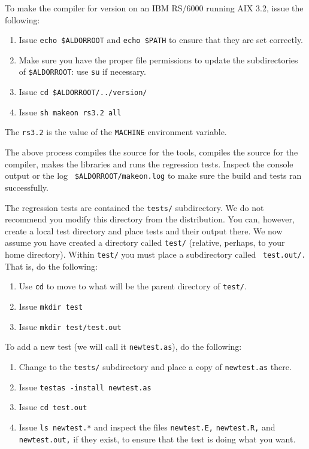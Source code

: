 To make the compiler for version {\tt \asharpver{}} on an IBM RS/6000
running AIX 3.2, issue the following:
\begin{enumerate}
\item Issue {\tt echo \$ALDORROOT} and {\tt echo \$PATH} to ensure
that they are set correctly.
\item Make sure you have the proper file permissions to update
the subdirectories of {\tt \$ALDORROOT}: use {\tt su} if
necessary.
\item Issue {\tt cd \$ALDORROOT/../version/\asharpver{}}
\item Issue {\tt sh makeon rs3.2 all}
\end{enumerate}

The {\tt rs3.2} is the value of the {\tt MACHINE} environment variable.

The above process compiles the source for the tools, compiles the
source for the compiler, makes the \asharp{} libraries and runs
the regression tests. Inspect the console output or the log {\tt
\$ALDORROOT/makeon.log} to make sure the build and tests ran
successfully.


The regression tests are contained the {\tt tests/} subdirectory.
We do not recommend you modify this directory from the
distribution.
You can, however, create a local test directory and place tests
and their output there.
We now assume you have created a directory called {\tt test/}
(relative, perhaps, to your home directory).
Within {\tt test/} you must place a subdirectory called {\tt
test.out/.}
That is, do the following:
\begin{enumerate}
\item Use {\tt cd} to move to what will be the parent directory of
{\tt test/}.
\item Issue {\tt mkdir test}
\item Issue {\tt mkdir test/test.out}
\end{enumerate}

To add a new test (we will call it {\tt newtest.as}), do the
following:
\begin{enumerate}
\item Change to the {\tt tests/} subdirectory and
place a copy of {\tt newtest.as} there.
\item Issue {\tt testas -install newtest.as}
\item Issue {\tt cd test.out}
\item Issue {\tt ls newtest.*} and inspect the files
{\tt newtest.E,} {\tt newtest.R,}
and {\tt newtest.out,} if they exist, to ensure that
the test is doing what you want.
\end{enumerate}

